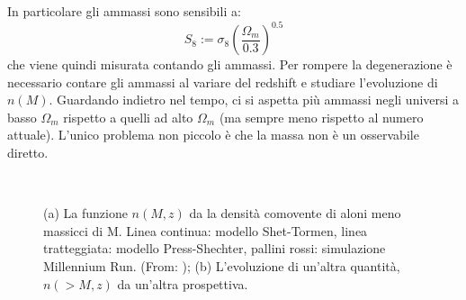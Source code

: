 In particolare gli ammassi sono sensibili a:
\begin{equation}
    S_8 := \sigma_8 \left(\frac{\Omega_m}{0.3}\right)^{0.5}
\end{equation}
che viene quindi misurata contando gli ammassi. Per rompere la degenerazione è necessario contare gli ammassi al variare del redshift e studiare l'evoluzione di $n(M)$. Guardando indietro nel tempo, ci si aspetta più ammassi negli universi a basso $\Omega_m$ rispetto a quelli ad alto $\Omega_m$ (ma sempre meno rispetto al numero attuale). L'unico problema non piccolo è che la massa non è un osservabile diretto.

\begin{figure}[H]
    \centering
    $\;\;$
    \caption{(a) La funzione $n(M,z)$ da la densità comovente di aloni meno massicci di M. Linea continua: modello Shet-Tormen, linea tratteggiata: modello Press-Shechter, pallini rossi: simulazione Millennium Run. (From: \cite{2005Natur.435..629S}); (b) L'evoluzione di un'altra quantità, $n(>M,z)$ da un'altra prospettiva.}
\end{figure}

\newpage
